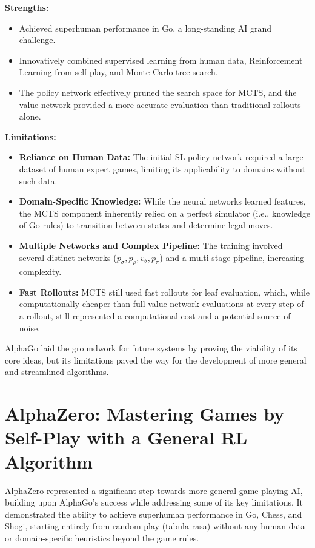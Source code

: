 \documentclass[11pt,a4paper]{article}
\begin{document}
\textbf{Strengths:}
\begin{itemize}
    \item Achieved superhuman performance in Go, a long-standing AI grand challenge.
    \item Innovatively combined supervised learning from human data, Reinforcement Learning from self-play, and Monte Carlo tree search.
    \item The policy network effectively pruned the search space for MCTS, and the value network provided a more accurate evaluation than traditional rollouts alone.
\end{itemize}

\textbf{Limitations:}
\begin{itemize}
    \item \textbf{Reliance on Human Data:} The initial SL policy network required a large dataset of human expert games, limiting its applicability to domains without such data.
    \item \textbf{Domain-Specific Knowledge:} While the neural networks learned features, the MCTS component inherently relied on a perfect simulator (i.e., knowledge of Go rules) to transition between states and determine legal moves.
    \item \textbf{Multiple Networks and Complex Pipeline:} The training involved several distinct networks ($p_{\sigma}, p_{\rho}, v_{\theta}, p_{\pi}$) and a multi-stage pipeline, increasing complexity.
    \item \textbf{Fast Rollouts:} MCTS still used fast rollouts for leaf evaluation, which, while computationally cheaper than full value network evaluations at every step of a rollout, still represented a computational cost and a potential source of noise.
\end{itemize}
AlphaGo laid the groundwork for future systems by proving the viability of its core ideas, but its limitations paved the way for the development of more general and streamlined algorithms.

\section{AlphaZero: Mastering Games by Self-Play with a General RL Algorithm}
AlphaZero \cite{alphazero} represented a significant step towards more general game-playing AI, building upon AlphaGo's success while addressing some of its key limitations. It demonstrated the ability to achieve superhuman performance in Go, Chess, and Shogi, starting entirely from random play (tabula rasa) without any human data or domain-specific heuristics beyond the game rules.
\end{document}

